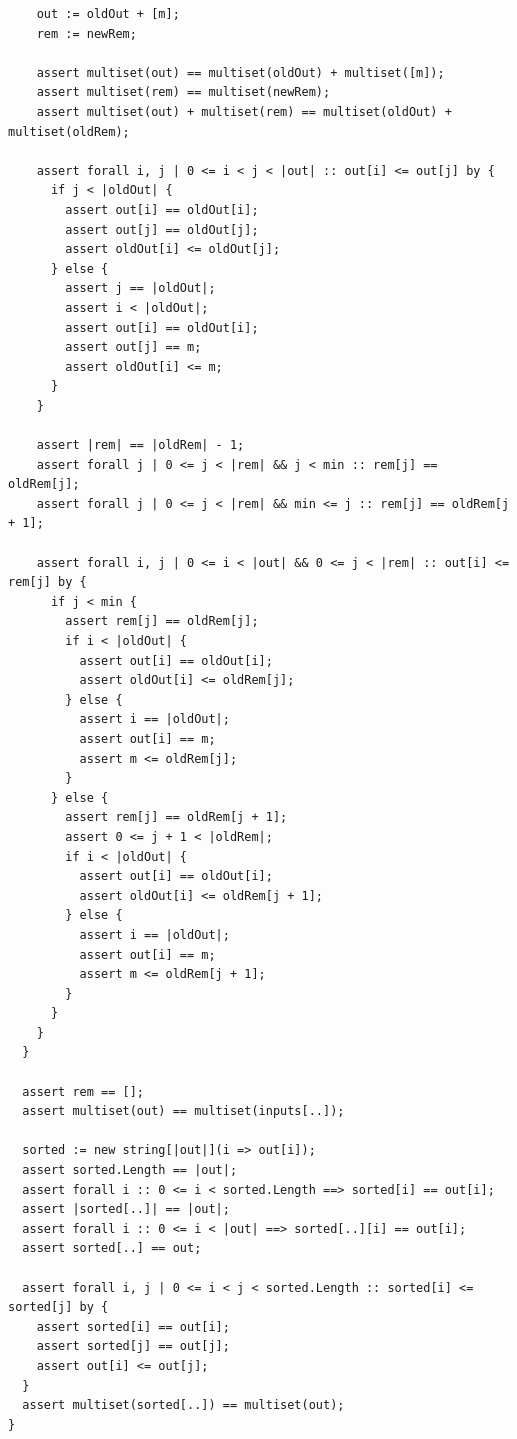 \documentclass{article}
\begin{document}
\begin{lstlisting}
    out := oldOut + [m];
    rem := newRem;

    assert multiset(out) == multiset(oldOut) + multiset([m]);
    assert multiset(rem) == multiset(newRem);
    assert multiset(out) + multiset(rem) == multiset(oldOut) + multiset(oldRem);

    assert forall i, j | 0 <= i < j < |out| :: out[i] <= out[j] by {
      if j < |oldOut| {
        assert out[i] == oldOut[i];
        assert out[j] == oldOut[j];
        assert oldOut[i] <= oldOut[j];
      } else {
        assert j == |oldOut|;
        assert i < |oldOut|;
        assert out[i] == oldOut[i];
        assert out[j] == m;
        assert oldOut[i] <= m;
      }
    }

    assert |rem| == |oldRem| - 1;
    assert forall j | 0 <= j < |rem| && j < min :: rem[j] == oldRem[j];
    assert forall j | 0 <= j < |rem| && min <= j :: rem[j] == oldRem[j + 1];

    assert forall i, j | 0 <= i < |out| && 0 <= j < |rem| :: out[i] <= rem[j] by {
      if j < min {
        assert rem[j] == oldRem[j];
        if i < |oldOut| {
          assert out[i] == oldOut[i];
          assert oldOut[i] <= oldRem[j];
        } else {
          assert i == |oldOut|;
          assert out[i] == m;
          assert m <= oldRem[j];
        }
      } else {
        assert rem[j] == oldRem[j + 1];
        assert 0 <= j + 1 < |oldRem|;
        if i < |oldOut| {
          assert out[i] == oldOut[i];
          assert oldOut[i] <= oldRem[j + 1];
        } else {
          assert i == |oldOut|;
          assert out[i] == m;
          assert m <= oldRem[j + 1];
        }
      }
    }
  }

  assert rem == [];
  assert multiset(out) == multiset(inputs[..]);

  sorted := new string[|out|](i => out[i]);
  assert sorted.Length == |out|;
  assert forall i :: 0 <= i < sorted.Length ==> sorted[i] == out[i];
  assert |sorted[..]| == |out|;
  assert forall i :: 0 <= i < |out| ==> sorted[..][i] == out[i];
  assert sorted[..] == out;

  assert forall i, j | 0 <= i < j < sorted.Length :: sorted[i] <= sorted[j] by {
    assert sorted[i] == out[i];
    assert sorted[j] == out[j];
    assert out[i] <= out[j];
  }
  assert multiset(sorted[..]) == multiset(out);
}
\end{lstlisting}
\end{document}
